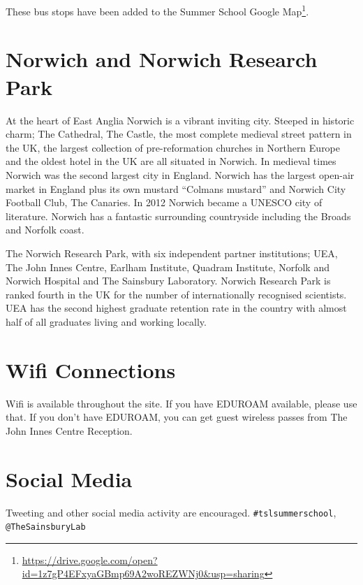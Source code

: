 \documentclass[12pt,]{book}
\let\rmarkdownfootnote\footnote%
\def\footnote{\protect\rmarkdownfootnote}
\renewcommand{\href}[2]{#2\footnote{\url{#1}}}
\theoremstyle{definition}
\theoremstyle{definition}
\theoremstyle{remark}
\begin{document}
These bus stops have been added to the
\href{https://drive.google.com/open?id=1z7gP4EFxyaGBmp69A2woREZWNj0\&usp=sharing}{Summer
School Google Map}.

\section*{Norwich and Norwich Research
Park}\label{norwich-and-norwich-research-park}

At the heart of East Anglia Norwich is a vibrant inviting city. Steeped
in historic charm; The Cathedral, The Castle, the most complete medieval
street pattern in the UK, the largest collection of pre-reformation
churches in Northern Europe and the oldest hotel in the UK are all
situated in Norwich. In medieval times Norwich was the second largest
city in England. Norwich has the largest open-air market in England plus
its own mustard ``Colmans mustard'' and Norwich City Football Club, The
Canaries. In 2012 Norwich became a UNESCO city of literature. Norwich
has a fantastic surrounding countryside including the Broads and Norfolk
coast.

The Norwich Research Park, with six independent partner institutions;
UEA, The John Innes Centre, Earlham Institute, Quadram Institute,
Norfolk and Norwich Hospital and The Sainsbury Laboratory. Norwich
Research Park is ranked fourth in the UK for the number of
internationally recognised scientists. UEA has the second highest
graduate retention rate in the country with almost half of all graduates
living and working locally.

\section*{Wifi Connections}\label{wifi-connections}

Wifi is available throughout the site. If you have EDUROAM available,
please use that. If you don't have EDUROAM, you can get guest wireless
passes from The John Innes Centre Reception.

\section*{Social Media}\label{social-media}

Tweeting and other social media activity are encouraged.
\texttt{\#tslsummerschool}, \texttt{@TheSainsburyLab}
\end{document}
